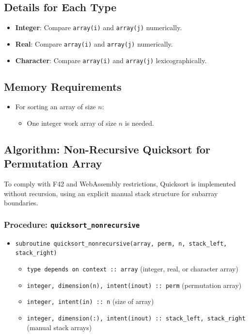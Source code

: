 \documentclass{article}
\begin{document}
\subsection{Details for Each Type}

\begin{itemize}
    \item \textbf{Integer}: Compare \texttt{array(i)} and \texttt{array(j)} numerically.
    \item \textbf{Real}: Compare \texttt{array(i)} and \texttt{array(j)} numerically.
    \item \textbf{Character}: Compare \texttt{array(i)} and \texttt{array(j)} lexicographically.
\end{itemize}

\subsection{Memory Requirements}

\begin{itemize}
    \item For sorting an array of size \( n \):
    \begin{itemize}
        \item One integer work array of size \( n \) is needed.
    \end{itemize}
\end{itemize}

\subsection{Algorithm: Non-Recursive Quicksort for Permutation Array}

To comply with F42 and WebAssembly restrictions, Quicksort is implemented without recursion,  
using an explicit manual stack structure for subarray boundaries.

\subsubsection{Procedure: \texttt{quicksort\_nonrecursive}}

\begin{itemize}
    \item \texttt{subroutine quicksort\_nonrecursive(array, perm, n, stack\_left, stack\_right)}
    \begin{itemize}
        \item \texttt{type depends on context :: array} \hfill (integer, real, or character array)
        \item \texttt{integer, dimension(n), intent(inout) :: perm} \hfill (permutation array)
        \item \texttt{integer, intent(in) :: n} \hfill (size of array)
        \item \texttt{integer, dimension(:), intent(inout) :: stack\_left, stack\_right} \hfill (manual stack arrays)
    \end{itemize}
\end{itemize}
\end{document}
